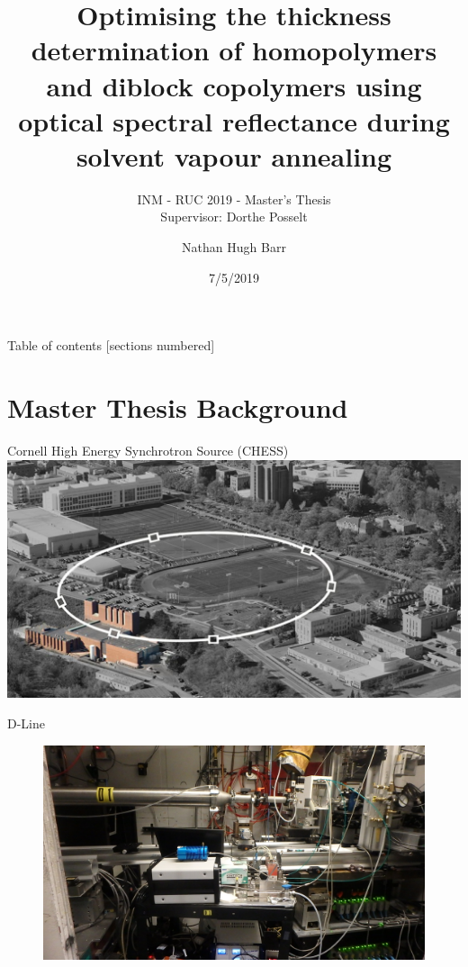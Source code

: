 \documentclass[10pt]{beamer}
\title{Optimising the thickness determination of homopolymers and diblock copolymers using optical spectral reflectance during solvent vapour annealing}
\subtitle{INM - RUC 2019 - Master's Thesis \\ Supervisor: Dorthe Posselt}
\date{7/5/2019}
\author{Nathan Hugh Barr}
\institute{Roskilde University}
\begin{document}
\maketitle

\begin{frame}{Table of contents}
  [sections numbered]
  \tableofcontents[hideallsubsections]
\end{frame}

\section{Master Thesis Background}

\begin{frame}{Cornell High Energy Synchrotron Source (CHESS)}
	\includegraphics[width=\textwidth]{Ring.jpg}
\end{frame}

\begin{frame}{D-Line}
\begin{figure}
	\includegraphics[scale=0.15]{chess3.JPG}
\end{figure}
\end{frame}
\end{document}
